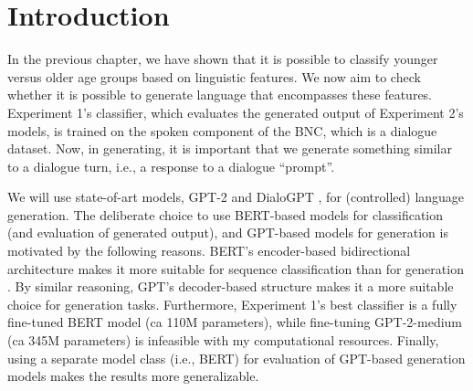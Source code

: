 \section{Introduction}





In the previous chapter, we have shown that it is possible to classify younger versus older age groups based on linguistic features. We now aim to check whether it is possible to generate language that encompasses these features. Experiment 1's classifier, which evaluates the generated output of Experiment 2's models, is trained on the spoken component of the BNC, which is a dialogue dataset. Now, in generating, it is important that we generate something similar to a dialogue turn, i.e., a response to a dialogue “prompt”. 

We will use state-of-art models, GPT-2 \citep{radford2019language} and DialoGPT \citep{zhang2019dialogpt}, for (controlled) language generation. The deliberate choice to use BERT-based models for classification (and evaluation of generated output), and GPT-based models for generation is motivated by the following reasons. BERT's encoder-based bidirectional architecture makes it more suitable for sequence classification than for generation \citep{devlin-etal-2019-bert}. By similar reasoning, GPT's decoder-based structure makes it a more suitable choice for generation tasks. Furthermore, Experiment 1's best classifier is a fully fine-tuned BERT model (ca 110M parameters), while fine-tuning GPT-2-medium (ca 345M parameters) is infeasible with my computational resources. Finally, using a separate model class (i.e., BERT) for evaluation of GPT-based generation models makes the results more generalizable.

